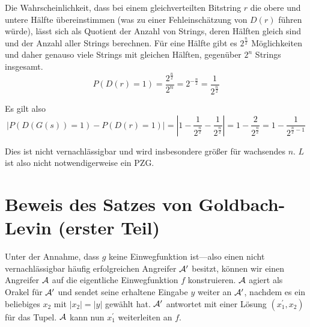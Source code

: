 \documentclass{../crypto}
\begin{document}
Die Wahrscheinlichkeit, dass bei einem gleichverteilten Bitstring $r$ die obere
und untere Hälfte übereinstimmen (was zu einer Fehleinschätzung von $D(r)$
führen würde), lässt sich als Quotient der Anzahl von Strings, deren Hälften
gleich sind und der Anzahl aller Strings berechnen. Für eine Hälfte gibt es
$2^{\frac{n}{2}}$ Möglichkeiten und daher genauso viele Strings mit gleichen
Hälften, gegenüber $2^n$ Strings insgesamt.
\begin{equation*}
   P(D(r) = 1) = \frac{2^{\frac{n}{2}}}{2^n} = 2^{-\frac{n}{2}} = \frac{1}{2^\frac{n}{2}}
\end{equation*}

Es gilt also 
\begin{equation*}
   \left\lvert P(D(G(s)) = 1) - P(D(r) = 1) \right\rvert = \left\lvert1 - \frac{1}{2^\frac{n}{2}} -
   \frac{1}{2^\frac{n}{2}}\right\rvert = 1 - \frac{2}{2^{\frac{n}{2}}} = 1 -
   \frac{1}{2^{\frac{n}{2} - 1}}
\end{equation*}

Dies ist nicht vernachlässigbar und wird insbesondere größer für wachsendes $n$.
$L$ ist also nicht notwendigerweise ein PZG.

\section{Beweis des Satzes von Goldbach-Levin (erster Teil)}

Unter der Annahme, dass $g$ keine Einwegfunktion ist---also einen nicht
vernachlässigbar häufig erfolgreichen Angreifer $\mathcal{A}^\prime$ besitzt,
können wir einen Angreifer $\mathcal{A}$ auf die eigentliche Einwegfunktion $f$
konstruieren. $\mathcal{A}$ agiert als Orakel für $\mathcal{A}^\prime$ und sendet
seine erhaltene Eingabe $y$ weiter an $\mathcal{A}^\prime$, nachdem es ein
beliebiges $x_2$ mit $|x_2| = |y|$ gewählt hat. $\mathcal{A}^\prime$
antwortet mit einer Lösung $(x_1^\prime,x_2)$ für das Tupel. $\mathcal{A}$ kann
nun $x_1^\prime$  weiterleiten an $f$. 

\begin{center}
\end{center}
\end{document}
